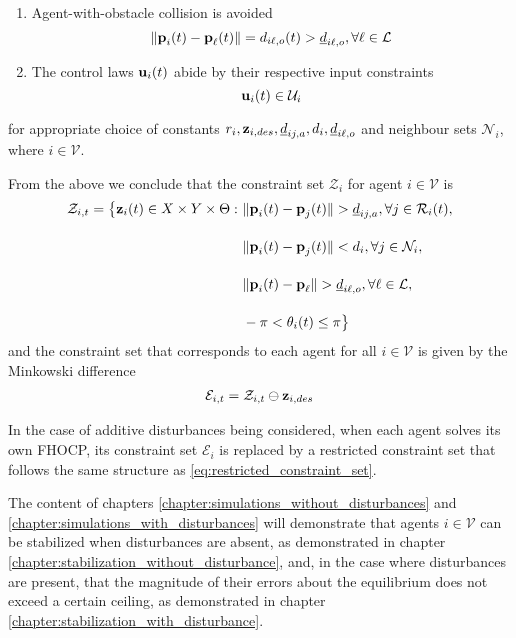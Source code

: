 \begin{problem}
\begin{enumerate}
  \item Agent-with-obstacle collision is avoided
    $$ \|\bm{\mathbf{p}}_i(t) - \bm{\mathbf{p}}_{\ell}(t)\| = d_{i\ell,o} (t) > \underline{d}_{i\ell,o},
    \forall \ell \in \mathcal{L}$$

  \item The control laws $\bm{\mathbf{u}}_i(t)$ abide by their respective input constraints
    $$\bm{\mathbf{u}}_i(t) \in \mathcal{U}_i$$
\end{enumerate}

for appropriate choice of constants
$r_i,\bm{\mathbf{z}}_{i,des},\underline{d}_{ij,a}, d_i,\underline{d}_{i\ell,o}$ and
neighbour sets $\mathcal{N}_i$, where $i \in \mathcal{V}$.
\end{problem}

From the above we conclude that the constraint set $\mathcal{Z}_i$ for
agent $i \in \mathcal{V}$ is
\begin{align}
  \mathcal{Z}_{i,t} = \big\{\bm{\mathbf{z}}_i(t) \in X \times Y \times \Theta : \
      & \|\bm{\mathbf{p}}_i(t) - \bm{\mathbf{p}}_j(t)\| > \underline{d}_{ij,a}, \forall j \in \mathcal{R}_i(t), \\[2.5ex]
      & \|\bm{\mathbf{p}}_i(t) - \bm{\mathbf{p}}_j(t)\| < d_i, \forall j \in \mathcal{N}_i, \\[2.5ex]
      & \|\bm{\mathbf{p}}_i(t) - \bm{\mathbf{p}}_{\ell}\| > \underline{d}_{i\ell,o}, \forall \ell \in \mathcal{L}, \\[2.5ex]
      & - \pi < \theta_i(t) \leq \pi \big\}
\end{align}
and the constraint set that corresponds to each agent for all
$i \in \mathcal{V}$  is given by the Minkowski difference
\begin{align}
  \mathcal{E}_{i,t} = \mathcal{Z}_{i,t} \ominus \bm{\mathbf{z}}_{i,des}
  \label{eq:error_constraint_set_unicycle}
\end{align}

In the case of additive disturbances being considered, when each agent solves
its own FHOCP, its constraint set $\mathcal{E}_i$ is replaced by a
restricted constraint set that follows the same structure as
\eqref{eq:restricted_constraint_set}.

The content of chapters \ref{chapter:simulations_without_disturbances} and
\ref{chapter:simulations_with_disturbances} will demonstrate that agents
$i \in \mathcal{V}$ can be stabilized when disturbances are absent, as
demonstrated in chapter \ref{chapter:stabilization_without_disturbance}, and,
in the case where disturbances are present, that the magnitude of their errors
about the equilibrium does not exceed a certain ceiling, as demonstrated in
chapter \ref{chapter:stabilization_with_disturbance}.
